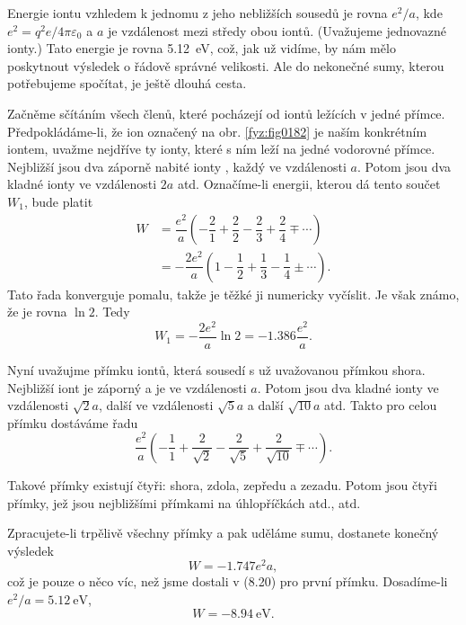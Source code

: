     Energie iontu vzhledem k jednomu z jeho nebližších sousedů je rovna \(e^2/a\), kde
    \(e^2=q^2e/4π\varepsilon_0\) a \(a\) je vzdálenost mezi středy obou iontů. (Uvažujeme jednovazné
    ionty.) Tato energie je rovna \SI{5.12}{\electronvolt}, což, jak už vidíme, by nám mělo
    poskytnout výsledek o řádově správné velikosti. Ale do nekonečné sumy, kterou potřebujeme
    spočítat, je ještě dlouhá cesta.

    Začněme sčítáním všech členů, které pocházejí od iontů ležících v jedné přímce.
    Předpokládáme-li, že ion označený  na obr. \ref{fyz:fig0182} je naším konkrétním iontem,
    uvažme nejdříve ty ionty, které s ním leží na jedné vodorovné přímce. Nejbližší jsou dva záporně
    nabité ionty , každý ve vzdálenosti \(a\). Potom jsou dva kladné ionty ve vzdálenosti
    \(2a\) atd. Označíme-li energii, kterou dá tento součet \(W_1\), bude platit
    \begin{align*}
      W &= \dfrac{e^2}{a}\left(−\dfrac{2}{1}+\dfrac{2}{2}−\dfrac{2}{3}+\dfrac{2}{4}∓\cdots\right) \\
        &=−\dfrac{2e^2}{a}\left(1−\dfrac{1}{2}+\dfrac{1}{3}−\dfrac{1}{4}±\cdots\right).
    \end{align*}
    Tato řada konverguje pomalu, takže je těžké ji numericky vyčíslit. Je však známo, že je rovna
    \(\ln2\). Tedy
    \begin{equation}\label{fyz:eq886}
      W_1=−\dfrac{2e^2}{a}\ln2=−\num{1.386}\dfrac{e^2}{a}.
    \end{equation}

    Nyní uvažujme přímku iontů, která sousedí s už uvažovanou přímkou shora. Nejbližší iont je
    záporný a je ve vzdálenosti \(a\). Potom jsou dva kladné ionty ve vzdálenosti \(\sqrt{2}a\),
    další ve vzdálenosti \(\sqrt{5}a\) a další \(\sqrt{10}a\) atd. Takto pro celou přímku dostáváme
    řadu
    \begin{equation}\label{fyz:eq887}
      \dfrac{e^2}{a}\left(−\dfrac{1}{1}+\dfrac{2}{\sqrt{2}}
                          -\dfrac{2}{\sqrt{5}}+\dfrac{2}{\sqrt{10}}∓\cdots
                    \right).
    \end{equation}

    Takové přímky existují čtyři: shora, zdola, zepředu a zezadu. Potom jsou čtyři přímky, jež jsou
    nejbližšími přímkami na úhlopříčkách atd., atd.

    Zpracujete-li trpělivě všechny přímky a pak uděláme sumu, dostanete konečný výsledek
    \begin{equation*}
      W=−\num{1.747}e^2a,
    \end{equation*}
    což je pouze o něco víc, než jsme dostali v (8.20) pro první přímku. Dosadíme-li \(e^2/a =
    \SI{5.12}{\electronvolt}\), 
    \begin{equation*}
      W=−\SI{8.94}{\electronvolt}.
    \end{equation*}

